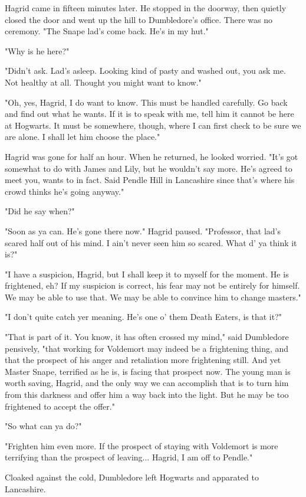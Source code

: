 \documentclass[a4paper,11pt]{article}
\begin{document}
Hagrid came in fifteen minutes later. He stopped in the doorway, then quietly closed the door and went up the hill to Dumbledore's office. There was no ceremony. "The Snape lad's come back. He's in my hut."

"Why is he here?"

"Didn't ask. Lad's asleep. Looking kind of pasty and washed out, you ask me. Not healthy at all. Thought you might want to know."

"Oh, yes, Hagrid, I do want to know. This must be handled carefully. Go back and find out what he wants. If it is to speak with me, tell him it cannot be here at Hogwarts. It must be somewhere, though, where I can first check to be sure we are alone. I shall let him choose the place."

Hagrid was gone for half an hour. When he returned, he looked worried. "It's got somewhat to do with James and Lily, but he wouldn't say more. He's agreed to meet you, wants to in fact. Said Pendle Hill in Lancashire since that's where his crowd thinks he's going anyway."

"Did he say when?"

"Soon as ya can. He's gone there now." Hagrid paused. "Professor, that lad's scared half out of his mind. I ain't never seen him so scared. What d' ya think it is?"

"I have a suspicion, Hagrid, but I shall keep it to myself for the moment. He is frightened, eh? If my suspicion is correct, his fear may not be entirely for himself. We may be able to use that. We may be able to convince him to change masters."

"I don't quite catch yer meaning. He's one o' them Death Eaters, is that it?"

"That is part of it. You know, it has often crossed my mind," said Dumbledore pensively, "that working for Voldemort may indeed be a frightening thing, and that the prospect of his anger and retaliation more frightening still. And yet Master Snape, terrified as he is, is facing that prospect now. The young man is worth saving, Hagrid, and the only way we can accomplish that is to turn him from this darkness and offer him a way back into the light. But he may be too frightened to accept the offer."

"So what can ya do?"

"Frighten him even more. If the prospect of staying with Voldemort is more terrifying than the prospect of leaving... Hagrid, I am off to Pendle."

Cloaked against the cold, Dumbledore left Hogwarts and apparated to Lancashire.
\end{document}
